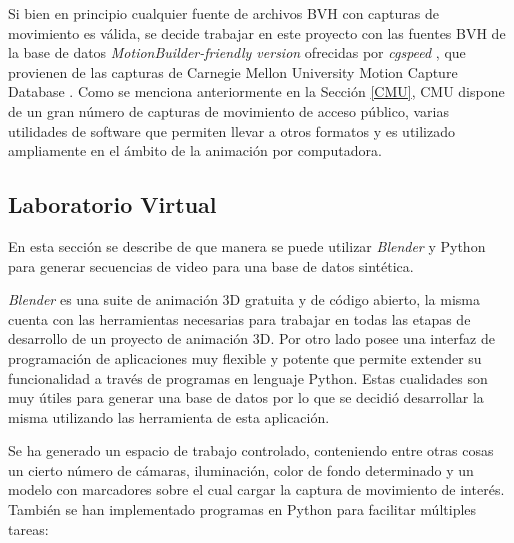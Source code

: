 Si bien en principio cualquier fuente de archivos BVH con capturas de movimiento es válida, se decide trabajar en este proyecto con las fuentes BVH de la base de datos \textit{MotionBuilder-friendly version} ofrecidas por \textit{cgspeed} \cite{cgspeed}, 
 que provienen de las capturas de Carnegie Mellon University Motion Capture Database \cite{CMU}.
 Como se menciona anteriormente en la Sección \ref{CMU}, CMU dispone de un gran número de capturas de movimiento de acceso público, varias utilidades de software que permiten llevar a otros formatos y es utilizado ampliamente en el ámbito de la animación por computadora.




\subsection{Laboratorio Virtual} %
En esta sección se describe de que manera se puede utilizar \textit{Blender} y Python para generar secuencias de video para una base de datos sintética.





\textit{Blender} es una suite de animación 3D gratuita y de código abierto, la misma cuenta con las herramientas necesarias para trabajar en todas las etapas de desarrollo de un proyecto de animación 3D. Por otro lado posee una interfaz de programación de aplicaciones muy flexible y potente que permite extender su funcionalidad a través de programas en lenguaje Python. Estas cualidades son muy útiles para generar una base de datos por lo que se decidió desarrollar la misma utilizando las herramienta de esta aplicación.

Se ha generado un espacio de trabajo controlado, conteniendo entre otras cosas un cierto número de cámaras, iluminación, color de fondo determinado y un modelo con marcadores sobre el cual cargar la captura de movimiento de interés. También se han implementado programas en Python para facilitar múltiples tareas:

